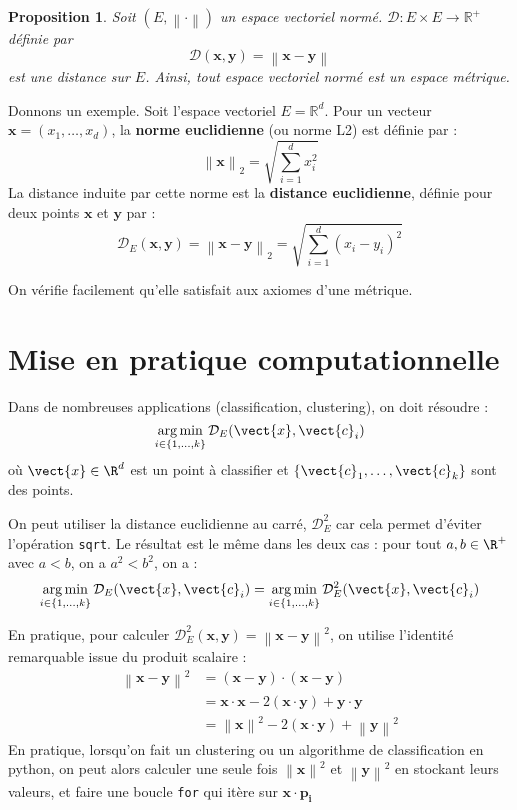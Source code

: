 \documentclass{article}
\newtheorem{proposition}{Proposition}[section]
\newcommand{\norm}[1]{\left\lVert#1\right\rVert}
\DeclareMathOperator{\argmin}{arg\,min}
\begin{document}
\begin{proposition}
Soit $(E, \norm{\cdot})$ un espace vectoriel normé. $\mathcal{D}: E \times E \to \mathbb{R}^+$ définie par
\[
\mathcal{D}(\mathbf{x}, \mathbf{y}) = \norm{\mathbf{x} - \mathbf{y}}
\]
est une distance sur $E$. Ainsi, tout espace vectoriel normé est un espace métrique.
\end{proposition}

Donnons un exemple. Soit l'espace vectoriel $E = \mathbb{R}^d$. Pour un vecteur $\mathbf{x} = (x_1, \dots, x_d)$, la \textbf{norme euclidienne} (ou norme L2) est définie par :
\[
\norm{\mathbf{x}}_2 = \sqrt{\sum_{i=1}^{d} x_i^2}
\]
La distance induite par cette norme est la \textbf{distance euclidienne}, définie pour deux points $\mathbf{x}$ et $\mathbf{y}$ par :
\[
\mathcal{D}_E(\mathbf{x}, \mathbf{y}) = \norm{\mathbf{x} - \mathbf{y}}_2 = \sqrt{\sum_{i=1}^{d} (x_i - y_i)^2}
\]

On vérifie facilement qu’elle satisfait aux axiomes d’une métrique.
\section{Mise en pratique computationnelle}

Dans de nombreuses applications (classification, clustering), on doit résoudre :
\[
\argmin_{i \in \{1, \ldots, k\}} \mathcal{D}_E(\vect{x}, \vect{c}_i)
\]
où $\vect{x} \in \R^d$ est un point à classifier et $\{\vect{c}_1, \ldots, \vect{c}_k\}$ sont des points.

On peut utiliser la distance euclidienne au carré, $\mathcal{D}_E^2$ car cela permet d'éviter l'opération \texttt{sqrt}. Le résultat est le même dans les deux cas : pour tout $a, b \in \R^+$ avec $a < b$, on a $a^2 < b^2$, on a :
\[
\argmin_{i \in \{1, \ldots, k\}} \mathcal{D}_E(\vect{x}, \vect{c}_i) = \argmin_{i \in \{1, \ldots, k\}} \mathcal{D}_E^2(\vect{x}, \vect{c}_i)
\]


En pratique, pour calculer $\mathcal{D}_E^2(\mathbf{x}, \mathbf{y}) = \norm{\mathbf{x} - \mathbf{y}}^2$, on utilise  l'identité remarquable issue du produit scalaire :
\begin{align*}
    \norm{\mathbf{x} - \mathbf{y}}^2 &= (\mathbf{x} - \mathbf{y}) \cdot (\mathbf{x} - \mathbf{y}) \\
    &= \mathbf{x} \cdot \mathbf{x} - 2(\mathbf{x} \cdot \mathbf{y}) + \mathbf{y} \cdot \mathbf{y} \\
    &= \norm{\mathbf{x}}^2 - 2(\mathbf{x} \cdot \mathbf{y}) + \norm{\mathbf{y}}^2
\end{align*}
En pratique, lorsqu'on fait un clustering ou un algorithme de classification en python, on peut alors calculer une seule fois $\norm{\mathbf{x}}^2$ et $\norm{\mathbf{y}}^2$ en stockant leurs valeurs, et faire une boucle \texttt{for} qui itère sur $\mathbf{x} \cdot \mathbf{p_i}$
\end{document}
